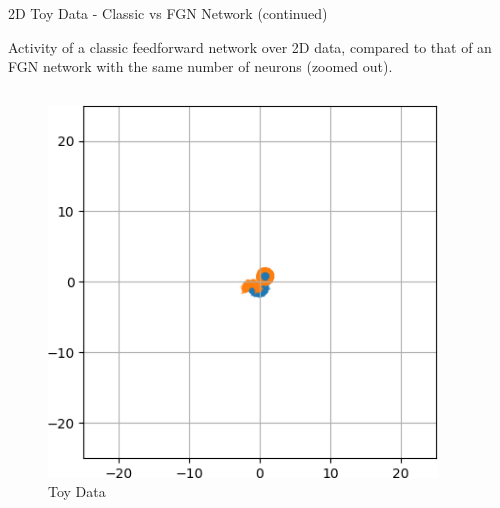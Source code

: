 \documentclass{beamer}
\begin{document}
\begin{frame}{2D Toy Data - Classic vs FGN Network (continued)}
    \vspace{-1cm}
    \begin{block}{}
    Activity of a classic feedforward network over 2D data, compared to that of an FGN network with the same number of neurons (zoomed out).
    \end{block}

    \begin{columns}
    \begin{column}{.333\textwidth}
    \begin{figure}
        \centering
        \includegraphics[width=0.92\textwidth]{images/2D-network-toy/2d-toy-data-zoomed-out.png}
        \caption*{Toy Data}
    \end{figure}
    \end{column}
    

\end{columns}
\end{frame}
\end{document}
